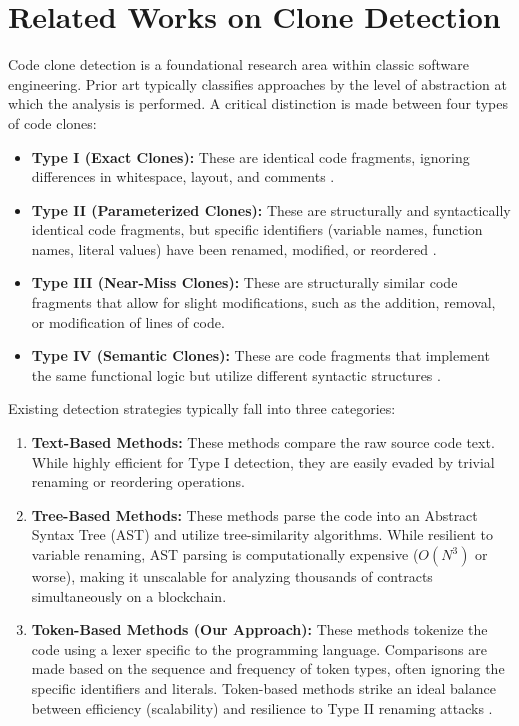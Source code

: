 \documentclass[12pt,a4paper]{article}
\begin{document}
\section{Related Works on Clone Detection}
Code clone detection is a foundational research area within classic software engineering. Prior art typically classifies approaches by the level of abstraction at which the analysis is performed. A critical distinction is made between four types of code clones:

\begin{itemize}
    \item \textbf{Type I (Exact Clones):} These are identical code fragments, ignoring differences in whitespace, layout, and comments \cite{kamiya2002ccfinder}.
    \item \textbf{Type II (Parameterized Clones):} These are structurally and syntactically identical code fragments, but specific identifiers (variable names, function names, literal values) have been renamed, modified, or reordered \cite{kamiya2002ccfinder}.
    \item \textbf{Type III (Near-Miss Clones):} These are structurally similar code fragments that allow for slight modifications, such as the addition, removal, or modification of lines of code.
    \item \textbf{Type IV (Semantic Clones):} These are code fragments that implement the same functional logic but utilize different syntactic structures \cite{liu2019ethain}.
\end{itemize}

Existing detection strategies typically fall into three categories:

\begin{enumerate}
    \item \textbf{Text-Based Methods:} These methods compare the raw source code text. While highly efficient for Type I detection, they are easily evaded by trivial renaming or reordering operations.
    \item \textbf{Tree-Based Methods:} These methods parse the code into an Abstract Syntax Tree (AST) and utilize tree-similarity algorithms. While resilient to variable renaming, AST parsing is computationally expensive ($O(N^3)$ or worse), making it unscalable for analyzing thousands of contracts simultaneously on a blockchain. 
    \item \textbf{Token-Based Methods (Our Approach):} These methods tokenize the code using a lexer specific to the programming language. Comparisons are made based on the sequence and frequency of token types, often ignoring the specific identifiers and literals. Token-based methods strike an ideal balance between efficiency (scalability) and resilience to Type II renaming attacks \cite{kamiya2002ccfinder}. 
\end{enumerate}
\end{document}
